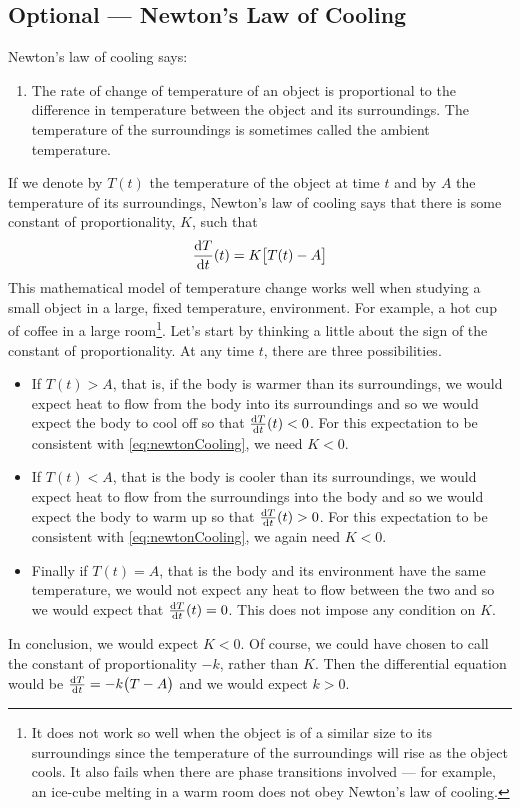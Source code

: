 \subsection{Optional --- Newton's Law of Cooling}
Newton's law of cooling says:
\begin{enumerate}[]
\item The rate of change of temperature of an object is proportional to
the difference in temperature between the object and its surroundings.
The temperature of the surroundings is sometimes called the ambient
temperature.
\end{enumerate}
If we denote by $T(t)$ the temperature of the object at time $t$
and by $A$ the temperature of its surroundings, Newton's law of cooling
says that there is some constant of proportionality, $K$, such that
\begin{equation}\label{eq:newtonCooling}
\diff{T}{t}(t) = K\big[T(t)-A\big]
\end{equation}
This mathematical model of temperature change works well when
studying a small object in a large, fixed temperature, environment.
For example, a hot cup of coffee in a large room\footnote{It does not
work so well when the object is of a similar size to its surroundings
since the temperature of the surroundings will rise as the object cools.
It also fails when there are phase transitions involved --- for example,
an ice-cube melting in a warm room does not obey Newton's law of cooling.}.
Let's start by thinking a little about
the sign of the constant of proportionality. At any time $t$,
there are three possibilities.
\begin{itemize} \itemsep1pt \parskip0pt
  \item  If $T(t)>A$, that is, if the body is warmer than its surroundings,
         we would expect heat to flow from the body into its surroundings
         and so we would expect the body to cool off so that
         $\diff{T}{t}(t)<0$. For this
         expectation to be consistent with \eqref{eq:newtonCooling},
         we need $K<0$.
  \item  If $T(t)<A$, that is the body is cooler than its surroundings,
         we would expect heat to flow from the surroundings into the body
         and so we would expect the body to warm up so that
         $\diff{T}{t}(t)>0$. For this
         expectation to be consistent with \eqref{eq:newtonCooling},
         we again need $K<0$.
  \item  Finally if $T(t)=A$, that is the body and its environment have
         the same temperature, we would not expect any heat to flow between
         the two and so we would expect that $\diff{T}{t}(t)=0$. This
         does not impose any condition on $K$.
\end{itemize}
In conclusion, we would expect $K<0$. Of course, we could have chosen to
call the constant of proportionality $-k$, rather than $K$. Then the
differential equation would be  $\diff{T}{t} = -k\big(T-A\big)$
and we would expect $k>0$.

